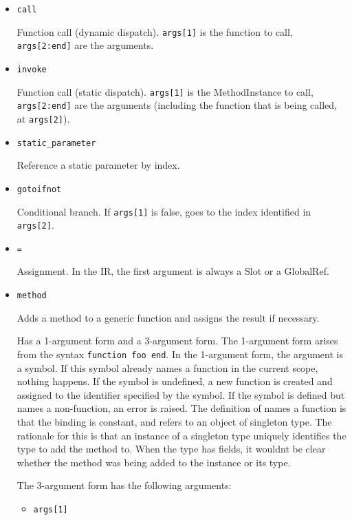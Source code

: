 \begin{itemize}
\item \texttt{call}

Function call (dynamic dispatch). \texttt{args[1]} is the function to call, \texttt{args[2:end]} are the arguments.


\item \texttt{invoke}

Function call (static dispatch). \texttt{args[1]} is the MethodInstance to call, \texttt{args[2:end]} are the arguments (including the function that is being called, at \texttt{args[2]}).


\item \texttt{static\_parameter}

Reference a static parameter by index.


\item \texttt{gotoifnot}

Conditional branch. If \texttt{args[1]} is false, goes to the index identified in \texttt{args[2]}.


\item \texttt{=}

Assignment. In the IR, the first argument is always a Slot or a GlobalRef.


\item \texttt{method}

Adds a method to a generic function and assigns the result if necessary.

Has a 1-argument form and a 3-argument form. The 1-argument form arises from the syntax \texttt{function foo end}. In the 1-argument form, the argument is a symbol. If this symbol already names a function in the current scope, nothing happens. If the symbol is undefined, a new function is created and assigned to the identifier specified by the symbol. If the symbol is defined but names a non-function, an error is raised. The definition of {\textquotedbl}names a function{\textquotedbl} is that the binding is constant, and refers to an object of singleton type. The rationale for this is that an instance of a singleton type uniquely identifies the type to add the method to. When the type has fields, it wouldn{\textquotesingle}t be clear whether the method was being added to the instance or its type.

The 3-argument form has the following arguments:

\begin{itemize}
\item \texttt{args[1]}


\end{itemize}
\end{itemize}
